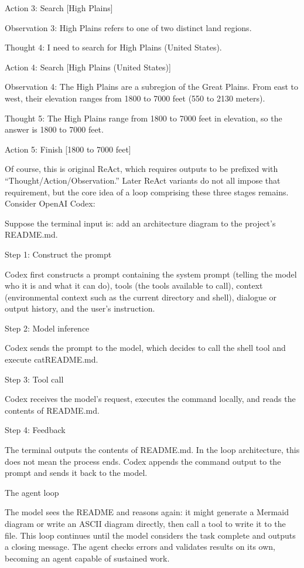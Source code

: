 Action 3: Search {[}High Plains{]}

Observation 3: High Plains refers to one of two distinct land regions.

Thought 4: I need to search for High Plains (United States).

Action 4: Search {[}High Plains (United States){]}

Observation 4: The High Plains are a subregion of the Great Plains. From east to west, their elevation ranges from 1800 to 7000 feet (550 to 2130 meters).

Thought 5: The High Plains range from 1800 to 7000 feet in elevation, so the answer is 1800 to 7000 feet.

Action 5: Finish {[}1800 to 7000 feet{]}

Of course, this is original ReAct, which requires outputs to be prefixed with ``Thought/Action/Observation.'' Later ReAct variants do not all impose that requirement, but the core idea of a loop comprising these three stages remains. Consider OpenAI Codex:

Suppose the terminal input is: add an architecture diagram to the project's README.md.

Step 1: Construct the prompt

Codex first constructs a prompt containing the system prompt (telling the model who it is and what it can do), tools (the tools available to call), context (environmental context such as the current directory and shell), dialogue or output history, and the user's instruction.

Step 2: Model inference

Codex sends the prompt to the model, which decides to call the shell tool and execute catREADME.md.

Step 3: Tool call

Codex receives the model's request, executes the command locally, and reads the contents of README.md.

Step 4: Feedback

The terminal outputs the contents of README.md. In the loop architecture, this does not mean the process ends. Codex appends the command output to the prompt and sends it back to the model.

The agent loop

The model sees the README and reasons again: it might generate a Mermaid diagram or write an ASCII diagram directly, then call a tool to write it to the file. This loop continues until the model considers the task complete and outputs a closing message. The agent checks errors and validates results on its own, becoming an agent capable of sustained work.

